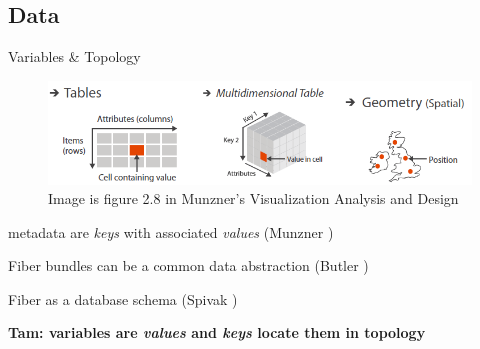 \documentclass[xcolor={dvipsnames}, handout]{beamer}
\begin{document}
\subsection{Data}
\begin{frame}{Variables \& Topology}
    \begin{figure}
        \includegraphics[width=1\textwidth]{figures/intro/munzner_datatypes.png}
        \caption{Image is figure 2.8 in Munzner's Visualization Analysis and Design\cite{munznerVisualizationAnalysisDesign2014}}
    \end{figure}
    \begin{description}
        \item  metadata are \textit{keys} with associated \textit{values} (Munzner \cite{munznerVisualizationAnalysisDesign2014})
        \item[topology] Fiber bundles can be a common data abstraction (Butler \cite{butlerVectorBundleClassesForm1992,butlerVisualizationModelBased1989})
        \item[variables] Fiber as a database schema (Spivak \cite{spivakDatabasesAreCategories2010,spivakSIMPLICIALDATABASES})
    \end{description}
    \pause
    \begin{center}
        \textbf{Tam: variables are \textit{values} and \textit{keys} locate them in topology}
    \end{center}
\end{frame}
\end{document}
